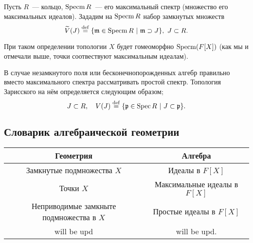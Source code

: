 Пусть $R$~--- кольцо, $\operatorname{Specm}{R}$~--- его максимальный спектр (множество его максимальных идеалов). 
Зададим на $\operatorname{Specm}{R}$ набор замкнутых множеств 
\[
	\widetilde{V}(J) \eqdef \{ \fm \in \Specm{R} \ \vert \ \fm \supset J \}, \ J \subset R. 
\]


При таком определении топологии $X$ будет гомеоморфно $\operatorname{Specm}(F[X])$ (как мы и отмечали выше, точки соотвествуют максимальным идеалам).

В случае незамкнутого поля или бесконечнопорожденных алгебр правильно вместо максимального спектра рассматривать простой спектр. Топология Зарисского на нём определяется следующим образом; 
\[
	J \subset R, \quad V(J) \stackrel{\mathrm{def}}{=} \{ \mathfrak{p} \in \operatorname{Spec}{R} \ \vert \ J \subset \mathfrak{p} \}.
\]

\subsection{Словарик алгебраической геометрии}



\begin{center}
	\begin{tabular}{ |c|c| }
		\hline
		Геометрия & Алгебра \\
		\hline
		Замкнутые подмножества $X$ & Идеалы в $F[X]$ \\
		Точки $X$ & Максимальные идеалы в $F[X]$ \\ 
		Неприводимые замкныте подмножества в $X$ & Простые идеалы в $F[X]$ \\ 
		will be upd & will be upd.\\
		\hline
	\end{tabular}
\end{center}

	




























